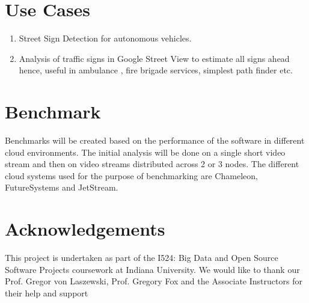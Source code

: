 \documentclass[9pt,twocolumn,twoside]{../../styles/osajnl}
\begin{document}
\section{Use Cases}
\begin{enumerate}
\item Street Sign Detection for autonomous vehicles.
\item Analysis of traffic signs in Google Street View to estimate all
  signs ahead hence, useful in ambulance , fire brigade services,
  simplest path finder etc.
\end{enumerate}

\section{Benchmark}
Benchmarks will be created based on the performance of the software in
different cloud environments. The initial analysis will be done on a
single short video stream and then on video streams distributed across
2 or 3 nodes. The different cloud systems used for the purpose of
benchmarking are Chameleon, FutureSystems and JetStream.



\section*{Acknowledgements}
This project is undertaken as part of the I524: Big Data and Open
Source Software Projects coursework at Indiana University. We would
like to thank our Prof. Gregor von Laszewski, Prof. Gregory Fox and
the Associate Instructors for their help and support


\end{document}
